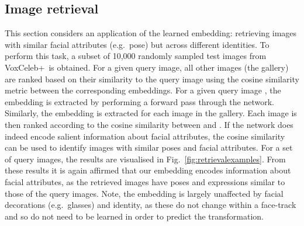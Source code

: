 \documentclass{bmvc2k}
\newcommand{\figref}[1]{Fig.~\ref{#1}}
\def\voxcombiname{VoxCeleb+}
\begin{document}
\subsection{Image retrieval}
\label{exp:informationretrieval}
This section considers an application of the learned embedding:
retrieving images with similar facial attributes (e.g.~pose) but
across different identities.  To perform this task, a subset of 10,000
randomly sampled test images from \voxcombiname~is obtained.  For a
given query image, all other images (the gallery) are ranked based on
their similarity to the query image using the cosine similarity metric
between the corresponding embeddings.  For a given query image ,
the embedding  is extracted by performing a forward pass through
the network.  Similarly, the embedding  is extracted for each
image  in the gallery.  Each image  is then ranked according
to the cosine similarity between  and .  If the network does
indeed encode salient information about facial attributes, the cosine
similarity can be used to identify images with similar poses and
facial attributes.  For a set of query images, the results are
visualised in \figref{fig:retrievalexamples}.  From these results it
is again affirmed that our embedding encodes information about facial
attributes, as the retrieved images have poses and expressions similar
to those of the query images.
Note, the embedding is largely unaffected by facial
decorations (e.g.\ glasses) and identity, as these do not change within a face-track and so do not need to be learned in order to predict the transformation.
\end{document}
